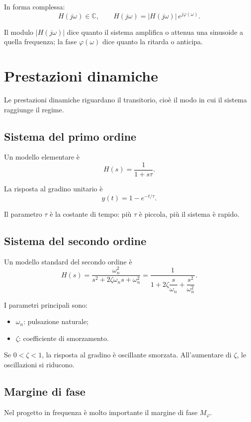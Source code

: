 In forma complessa:
\[
H(j\omega)\in\mathbb{C},
\qquad
H(j\omega)=|H(j\omega)|\,e^{j\varphi(\omega)}.
\]

Il modulo \(|H(j\omega)|\) dice quanto il sistema amplifica o attenua
una sinusoide a quella frequenza; la fase \(\varphi(\omega)\) dice quanto la ritarda o anticipa.

\section{Prestazioni dinamiche}

Le prestazioni dinamiche riguardano il transitorio, cioè il modo in cui il sistema
raggiunge il regime.

\subsection{Sistema del primo ordine}

Un modello elementare è
\[
H(s)=\frac{1}{1+s\tau}.
\]

La risposta al gradino unitario è
\[
y(t)=1-e^{-t/\tau}.
\]

Il parametro \(\tau\) è la costante di tempo:
più \(\tau\) è piccola, più il sistema è rapido.

\subsection{Sistema del secondo ordine}

Un modello standard del secondo ordine è
\[
H(s)=\frac{\omega_n^2}{s^2+2\zeta\omega_n s+\omega_n^2}
=
\frac{1}{1+2\zeta \dfrac{s}{\omega_n}+\dfrac{s^2}{\omega_n^2}}.
\]

I parametri principali sono:
\begin{itemize}
    \item \(\omega_n\): pulsazione naturale;
    \item \(\zeta\): coefficiente di smorzamento.
\end{itemize}

Se \(0<\zeta<1\), la risposta al gradino è oscillante smorzata.
All'aumentare di \(\zeta\), le oscillazioni si riducono.

\subsection{Margine di fase}

Nel progetto in frequenza è molto importante il margine di fase \(M_\varphi\).

